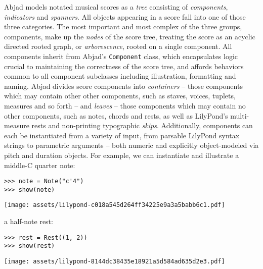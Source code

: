 Abjad models notated musical scores as a \emph{tree} consisting of
\emph{components}, \emph{indicators} and \emph{spanners}. All objects appearing
in a score fall into one of those three categories. The most important and most
complex of the three groups, components, make up the \emph{nodes} of the score
tree, treating the score as an acyclic directed rooted graph, or
\emph{arborescence}, rooted on a single component. All components inherit from
Abjad's \texttt{Component} class, which encapsulates logic crucial to
maintaining the correctness of the score tree, and affords behaviors common to
all component subclasses including illustration, formatting and naming. Abjad
divides score components into \emph{containers} -- those components which may
contain other other components, such as staves, voices, tuplets, measures and
so forth -- and \emph{leaves} -- those components which may contain no other
components, such as notes, chords and rests, as well as LilyPond's
multi-measure rests and non-printing typographic \emph{skips}. Additionally,
components can each be instantiated from a variety of input, from parsable
LilyPond syntax strings to parametric arguments -- both numeric and explicitly
object-modeled via pitch and duration objects. For example, we can instantiate
and illustrate a middle-C quarter note:

\begin{comment}
<abjad>
note = Note("c'4")
show(note)
</abjad>
\end{comment}

\begin{abjadbookoutput}
\begin{singlespacing}
\vspace{-0.5\baselineskip}
\begin{lstlisting}
>>> note = Note("c'4")
>>> show(note)
\end{lstlisting}
\noindent\texttt{[image: assets/lilypond-c018a545d264ff34225e9a3a5babb6c1.pdf]}
\end{singlespacing}
\end{abjadbookoutput}

\noindent a half-note rest:

\begin{comment}
<abjad>
rest = Rest((1, 2))
show(rest)
</abjad>
\end{comment}

\begin{abjadbookoutput}
\begin{singlespacing}
\vspace{-0.5\baselineskip}
\begin{lstlisting}
>>> rest = Rest((1, 2))
>>> show(rest)
\end{lstlisting}
\noindent\texttt{[image: assets/lilypond-8144dc38435e18921a5d584ad635d2e3.pdf]}
\end{singlespacing}
\end{abjadbookoutput}

